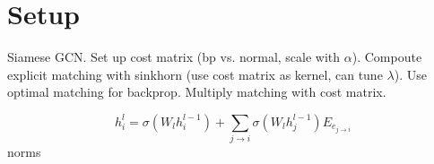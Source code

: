 \section{Setup}

Siamese GCN.
Set up cost matrix (bp vs. normal, scale with $\alpha$).
Compoute explicit matching with sinkhorn (use cost matrix as kernel, can tune $\lambda$).
Use optimal matching for backprop.
Multiply matching with cost matrix.



\begin{equation}
     h_i^{l} = \sigma(W_{l} h_i^{l-1}) + \sum_{j \rightarrow i} \sigma(W_{l} h_j^{l-1}) E_{e_{j \rightarrow i}}
\end{equation}
norms




